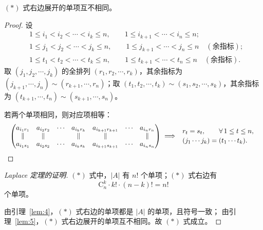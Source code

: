 
\begin{lemma}
\label{lem:5}$(*)$ 式右边展开的单项互不相同。
\end{lemma}

\begin{proof}
设
\begin{align*}
&1\le i_1<i_2<\cdots<i_k\le n,\qquad 1\le i_{k+1}<\cdots<i_n\le n;\\
&1\le j_1<j_2<\cdots<j_k\le n,\qquad 1\le j_{k+1}<\cdots<j_n\le n\quad(\text{余指标});\\
&1\le t_1<t_2<\cdots<t_k\le n,\qquad 1\le t_{k+1}<\cdots<t_n\le n\quad(\text{余指标}).
\end{align*}
取 $(j_1,j_2,\cdots,j_k)$ 的全排列 $(r_1,r_2,\cdots,r_k)$，其余指标为
$(j_{k+1},\cdots,j_n)\sim(r_{k+1},\cdots,r_n)$；取
$(t_1,t_2,\cdots,t_k)\sim(s_1,s_2,\cdots,s_k)$，其余指标为
$(t_{k+1},\cdots,t_n)\sim(s_{k+1},\cdots,s_n)$。

若两个单项相同，则对应项相等：
\[
\resizebox{\ifdim\width>\linewidth\linewidth\else\width\fi}{!}{$\displaystyle
\begin{pmatrix}
a_{i_1r_1} & a_{i_2r_2} & \cdots & a_{i_kr_k} & a_{i_{k+1}r_{k+1}} & \cdots & a_{i_nr_n}\\
\parallel & \parallel & & \parallel & \parallel & & \parallel\\
a_{i_1s_1} & a_{i_2s_2} & \cdots & a_{i_ks_k} & a_{i_{k+1}s_{k+1}} & \cdots & a_{i_ns_n}
\end{pmatrix}
\;\Longrightarrow\;
\begin{array}{l}
r_t=s_t,\qquad \forall\,1\le t\le n,\\[2pt]
(j_1\cdots j_k)=(t_1\cdots t_k).
\end{array}$}
\]
\end{proof}

\begin{proof}[\normalfont Laplace 定理的证明]
$(*)$ 式中，$|A|$ 有 $n!$ 个单项；$(*)$ 式右边有
\[
\mathrm{C}_n^k\cdot k!\cdot(n-k)!=n!
\]
个单项。

由引理~\ref{lem:4}，$(*)$ 式右边的单项都是 $|A|$ 的单项，且符号一致；
由引理~\ref{lem:5}，$(*)$ 式右边展开的单项互不相同。故 $(*)$ 式成立。
\end{proof}

